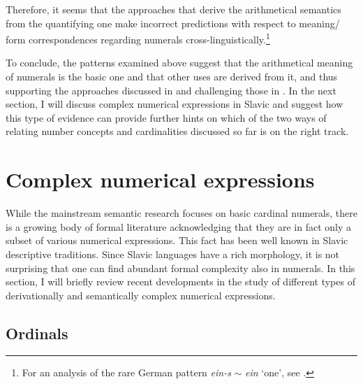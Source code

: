 \documentclass[output=paper]{langscibook}
\begin{document}
	\ea {}\label{ex:japanese-quantifying}
	\label{ex:japanese-arithmetical}
	\z
	\z

	\noindent Therefore, it seems that the approaches that derive the arithmetical semantics from the quantifying one make incorrect predictions with respect to meaning/ form correspondences regarding numerals cross-linguistically.\footnote{For an analysis of the rare German pattern \textit{ein-s} $\sim$ \textit{ein} `one', see \citet{wagiel_caha2020universal}.} 
 
    To conclude, the patterns examined above suggest that the arithmetical meaning of numerals is the basic one and that other uses are derived from it, and thus supporting the approaches discussed in  and challenging those in . In the next section, I will discuss complex numerical expressions in Slavic and suggest how this type of evidence can provide further hints on which of the two ways of relating number concepts and cardinalities discussed so far is on the right track.
	
	\section{Complex numerical expressions}\label{sec:complex-numerical-expressions}

    While the mainstream semantic research focuses on basic cardinal numerals, there is a growing body of formal literature acknowledging that they are in fact only a subset of various numerical expressions. This fact has been well known in Slavic descriptive traditions. Since Slavic languages have a rich morphology, it is not surprising that one can find abundant formal complexity also in numerals. In this section, I will briefly review recent developments in the study of different types of derivationally and semantically complex numerical expressions. 
	\subsection{Ordinals}\label{sec:ordinals}
	
\end{document}

